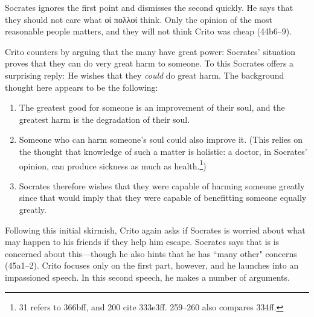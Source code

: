 \documentclass[11pt]{article}
\begin{document}
Socrates ignores the first point and dismisses the second quickly.  He says
that they should not care what {\g οἱ πολλοί} think. Only the opinion of
the most reasonable people matters, and they will not think Crito was cheap
(44b6--9).

Crito counters by arguing that the many have great power:  Socrates'
situation proves that they can do very great harm to someone.  To this
Socrates offers a surprising reply: He wishes that they \emph{could} do
great harm.  The background thought here appears to be the following:

\begin{enumerate}

    \item The greatest good for someone is an improvement of their soul,
        and the greatest harm is the degradation of their soul.

    \item Someone who can harm someone's soul could also improve it.  (This
        relies on the thought that knowledge of such a matter is holistic:
        a doctor, in Socrates' opinion, can produce sickness as much as
        health.\footnote{\citet{adam1988} 31 refers to 
        366bff, and \citet{brickhouse2004} 200 cite 
        333e3ff.  \citet{burnet1924} 259--260 also compares 
        334ff.})

    \item Socrates therefore wishes that they were capable of harming
        someone greatly since that would imply that they were capable of
        benefitting someone equally greatly.

\end{enumerate}

Following this initial skirmish, Crito again asks if Socrates is worried
about what may happen to his friends if they help him escape.  Socrates
says that is is concerned about this---though he also hints that he has
``many other" concerns (45a1--2).  Crito focuses only on the first part,
however, and he launches into an impassioned speech.  In this second
speech, he makes a number of arguments.
\end{document}
